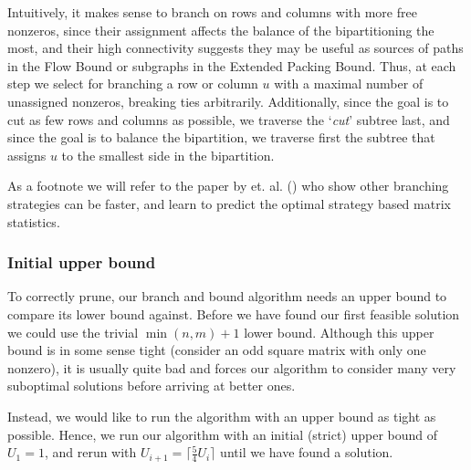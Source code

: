 \documentclass{article}
\begin{document}
	Intuitively, it makes sense to branch on rows and columns with more free
	nonzeros, since their assignment affects the balance of the bipartitioning
	the most, and their high connectivity suggests they may be useful as
	sources of paths in the Flow Bound or subgraphs in the Extended Packing
	Bound. Thus, at each step we select for branching a row or column $u$
	with a maximal
	number of unassigned nonzeros, breaking ties arbitrarily. Additionally,
	since the goal is to cut as few rows and columns as possible, we traverse
	the `\textit{cut}' subtree last, and since the goal is to balance the
	bipartition, we traverse first the subtree that assigns $u$ to the smallest
	side in the bipartition.

	As a footnote we will refer to the paper by  et. al. (\cite{}) who show
	other branching strategies can be faster, and learn to predict the optimal
	strategy based matrix statistics.
	
	\subsubsection{Initial upper bound}

	To correctly prune, our branch and bound algorithm needs an upper bound to
	compare its lower bound against. Before we have found our first feasible
	solution we could use the trivial $\min(n, m) + 1$ lower bound. Although
	this upper bound is in some sense tight (consider an odd square matrix
	with only one nonzero), it is usually quite bad and forces our algorithm
	to consider many very suboptimal solutions before arriving at better ones.

	Instead, we would like to run the algorithm with an upper bound as tight
	as possible. Hence, we run our algorithm with an initial (strict) upper
	bound of $U_1 = 1$, and rerun with
	$U_{i+1} = \lceil \frac{5}{4} U_i \rceil$ until we have found a solution.
\end{document}
